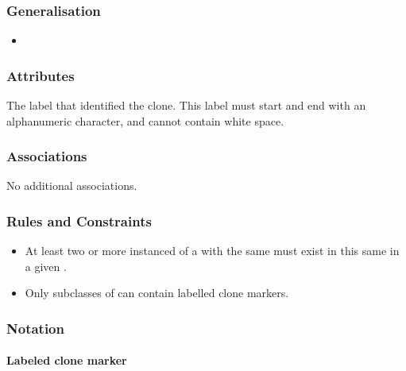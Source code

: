 \subsubsection{Generalisation}

\begin{itemize}
\item {}
\end{itemize}

\subsubsection{Attributes}

\begin{attributes}
   The label that identified the clone. This
  label must start and end with an alphanumeric character, and cannot
  contain white space.
\end{attributes}

\subsubsection{Associations}

No additional associations.

\subsubsection{Rules and Constraints}

\begin{itemize}
\item At least two or more instanced of a
   with the same  must
  exist in this same in a given .
\item Only subclasses of  can contain
labelled clone markers.
\end{itemize}

\subsubsection{Notation}

\paragraph{Labeled clone marker}

